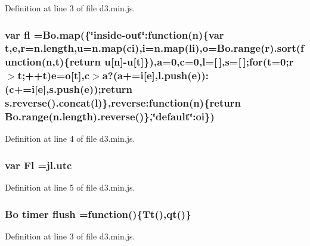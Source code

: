 Definition at line 3 of file d3.\+min.\+js.

\subsubsection[{fl}]{\setlength{\rightskip}{0pt plus 5cm}var fl ={\bf Bo.\+map}(\{\char`\"{}inside-\/out\char`\"{}\+:function({\bf n})\{var t,{\bf e},{\bf r}=n.\+length,u={\bf n.\+map}({\bf ci}),{\bf i}={\bf n.\+map}({\bf li}),{\bf o}={\bf Bo.\+range}({\bf r}).{\bf sort}(function({\bf n},t)\{{\bf return} u[{\bf n}]-\/u[t]\}),{\bf a}=0,{\bf c}=0,l=[$\,$],s=[$\,$];{\bf for}(t=0;{\bf r}$>$t;++t){\bf e}={\bf o}[t],{\bf c}$>${\bf a}?({\bf a}+={\bf i}[{\bf e}],l.\+push({\bf e}))\+:({\bf c}+={\bf i}[{\bf e}],s.\+push({\bf e}));{\bf return} {\bf s.\+reverse}().concat(l)\},reverse\+:function({\bf n})\{{\bf return} {\bf Bo.\+range}(n.\+length).{\bf reverse}()\},\char`\"{}default\char`\"{}\+:oi\})}\label{d3_8min_8js_a956c68886c79a2364432af8882683287}


Definition at line 4 of file d3.\+min.\+js.

\subsubsection[{Fl}]{\setlength{\rightskip}{0pt plus 5cm}var Fl ={\bf jl.\+utc}}\label{d3_8min_8js_ac554ead470b881f4712c6e90e858ab82}


Definition at line 5 of file d3.\+min.\+js.

\subsubsection[{flush}]{ {\bf Bo} {\bf timer} flush =function()\{Tt(),qt()\}}\label{d3_8min_8js_a818fbba7a975c6edc82859a681127bf2}


Definition at line 3 of file d3.\+min.\+js.

